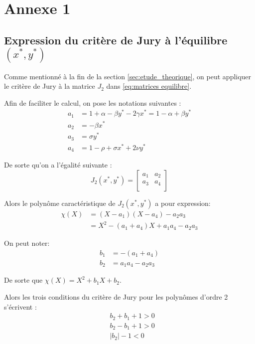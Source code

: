 \chapter*{Annexe 1}

\makeatletter
\renewcommand{\thesection}{\@arabic\c@section}
\makeatother

\setcounter{section}{0}

\section*{Expression du critère de Jury à l'équilibre $(x^*, y^*)$}

Comme mentionné à la fin de la section \ref{sec:etude_theorique}, on peut appliquer le critère de Jury à la matrice $J_2$ dans \ref{eq:matrices equilibre}.

Afin de faciliter le calcul, on pose les notations suivantes :
\begin{align*}
    a_1 &= 1 +\alpha - \beta y^* - 2 \gamma x^* = 1 - \alpha + \beta y^* \\
    a_2 &= - \beta x^* \\
    a_3 &= \sigma y^* \\
    a_4 &= 1 - \rho + \sigma x^* + 2 \nu y^*
\end{align*}

De sorte qu'on a l'égalité suivante :
\begin{equation*}
    J_2(x^*, y^*) = 
    \begin{bmatrix}
        a_1 & a_2 \\
        a_3 & a_4 \\
    \end{bmatrix}
\end{equation*}

Alors le polynôme caractéristique de $J_2(x^*, y^*)$ a pour expression:
\begin{align*}
    \chi(X) &= (X - a_1)(X - a_4) - a_2 a_3 \\
            &= X^2 - (a_1 + a_4) X + a_1 a_4 - a_2 a_3
\end{align*}

On peut noter:
\begin{align*}
    b_1 &= - (a_1 + a_4) \\
    b_2 &= a_1 a_4 - a_2 a_3
\end{align*}

De sorte que $\chi(X) = X^2 + b_1 X + b_2$.

Alors les trois conditions du critère de Jury pour les polynômes d'ordre 2 s'écrivent :
\begin{align}
    & b_2 + b_1 + 1 > 0 \\
    & b_2 - b_1 + 1 > 0 \\
    &|b_2| - 1 < 0
\end{align}
